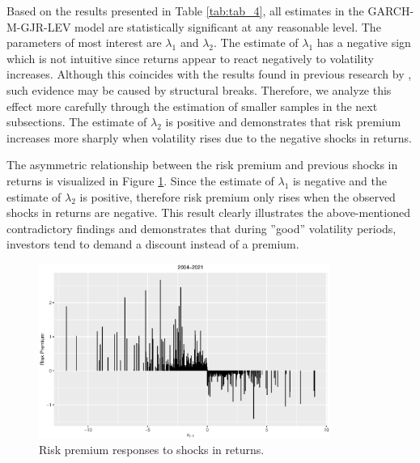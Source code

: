 \documentclass[authoryear, 1p]{elsarticle}
\numberwithin{equation}{section}
\begin{document}
Based on the results presented in Table \ref{tab:tab_4}, all estimates in the GARCH-M-GJR-LEV model are statistically significant at any reasonable level. The parameters of most interest are $\lambda_{1}$ and $\lambda_{2}$. The estimate of $\lambda_{1}$ has a negative sign which is not intuitive since returns appear to react negatively to volatility increases. Although this coincides with the results found in previous research by \citep{Bollerslev2022}, such evidence may be caused by structural breaks. Therefore, we analyze this effect more carefully through the estimation of smaller samples in the next subsections. The estimate of $\lambda_{2}$ is positive and demonstrates that risk premium increases more sharply when volatility rises due to the negative shocks in returns. 

The asymmetric relationship between the risk premium and previous shocks in returns is visualized in Figure \ref{fig:plot_1}. Since the estimate of $\lambda_1$ is negative and the estimate of $\lambda_{2}$ is positive, therefore risk premium only rises when the observed shocks in returns are negative. This result clearly illustrates the above-mentioned contradictory findings and demonstrates that during ''good'' volatility periods, investors tend to demand a discount instead of a premium.

\begin{figure}[h!] %
\centering
\includegraphics[width=0.85\textwidth]{Plots/Plot_whole.eps}
\caption{Risk premium responses to shocks in returns.}
\label{fig:plot_1}
\end{figure}
\end{document}
